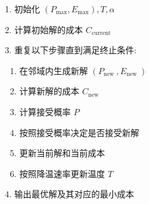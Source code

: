 \documentclass{cumcmthesis}
\begin{document}
\begin{minipage}{0.5\textwidth} %
  
1. 初始化 $\left(P_{\max }, E_{\max }\right), T, \alpha$  
  
2. 计算初始解的成本 $C_{\text {current }}$  
  
3. 重复以下步骤直到满足终止条件:  
  
\begin{enumerate}  
    \item 在邻域内生成新解 $\left(P_{\text {new }}, E_{\text {new }}\right)$  
    \item 计算新解的成本 $C_{\text {new }}$  
    \item 计算接受概率 $P$  
    \item 按照接受概率决定是否接受新解  
    \item 更新当前解和当前成本  
    \item 按照降温速率更新温度 $T$  
\end{enumerate}  
  
4. 输出最优解及其对应的最小成本  
  
\end{minipage}  
\hfill %
\end{document}

